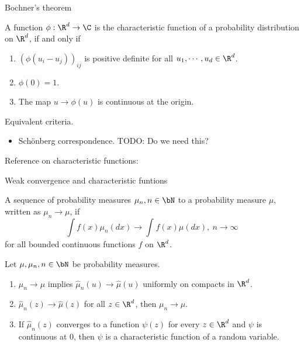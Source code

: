 \begin{frame}
    {Bochner's theorem}
    
    \begin{theorem}[Bochner]
        A function $\phi: \R^d \to \C$ is the characteristic function of 
        a probability distribution on $\R^d$, if and only if
        \begin{enumerate}
            \item $ \left( \phi(u_i - u_j) \right)_{ij}$ is positive definite
                for all $u_1, \cdots, u_d \in \R^d$.  
            \item $\phi(0)=1$.
            \item The map $u \to \phi(u)$ is continuous at the origin. 
        \end{enumerate}
        
    \end{theorem}

    Equivalent criteria. 
    \begin{itemize}
        \item Schönberg correspondence. TODO: Do we need this? 
    \end{itemize}

    Reference on characteristic functions: \cite{lukacs1970characteristic}
\end{frame}


\begin{frame}
    {Weak convergence and characteristic funtions}
    
    \begin{definition}
        A sequence of probability measures $\mu_n, n\in\bN$  to a probability measure $\mu$, written as $\mu_n\to\mu$, if
        \begin{equation*}
            \int f(x) \mu_n(dx) \to \int_{}^{} f(x) \mu(dx), \ n\to\infty
        \end{equation*}
        for all bounded continuous functions $f$ on $\R^d$.
    \end{definition}

    \begin{theorem}
        Let $\mu,\mu_n, n\in\bN$ be probability measures.
        \begin{enumerate}
            \item $\mu_n \to \mu$ implies $\hat \mu_n(u) \to \hat \mu(u)$ uniformly
                on compacts in $\R^d$.
            \item $\hat\mu_n(z) \to \hat\mu(z)$ for all $z\in\R^d$, then $\mu_n\to\mu$.
            \item If $\hat \mu_n(z)$ converges to a function $\psi(z)$ for 
                every $z\in\R^d$ and $\psi$ is continuous at $0$, then
                $\psi$ is a characteristic function of a random variable.
        \end{enumerate}
    \end{theorem}


\end{frame}




